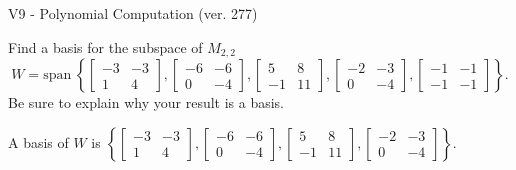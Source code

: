 \begin{exercise}
  \begin{exerciseTitle}V9 - Polynomial Computation (ver. 277)\end{exerciseTitle}
  \begin{exerciseStatement}
    Find a basis for the subspace of \(M_{2,2}\) 
\[W=\mathrm{span}\ \left\{\left[\begin{array}{cc}
-3 & -3 \\
1 & 4
\end{array}\right] , \left[\begin{array}{cc}
-6 & -6 \\
0 & -4
\end{array}\right] , \left[\begin{array}{cc}
5 & 8 \\
-1 & 11
\end{array}\right] , \left[\begin{array}{cc}
-2 & -3 \\
0 & -4
\end{array}\right] , \left[\begin{array}{cc}
-1 & -1 \\
-1 & -1
\end{array}\right]\right\}.\]
 Be sure to explain why your result is a basis.


  \end{exerciseStatement}
  \begin{exerciseAnswer}
   A basis of \(W\) is  \(\left\{\left[\begin{array}{cc}
-3 & -3 \\
1 & 4
\end{array}\right] , \left[\begin{array}{cc}
-6 & -6 \\
0 & -4
\end{array}\right] , \left[\begin{array}{cc}
5 & 8 \\
-1 & 11
\end{array}\right] , \left[\begin{array}{cc}
-2 & -3 \\
0 & -4
\end{array}\right]\right\}\).
  


  \end{exerciseAnswer}
\end{exercise}